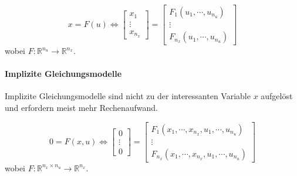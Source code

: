			\begin{equation*}
				x = F(u) \iff
				\begin{bmatrix}
					x _ 1  \\
					\vdots \\
					x _ { n _ x }
				\end{bmatrix}
				=
				\begin{bmatrix}
					F _ 1 (u _ 1, \cdots, u _ { n _ u }) \\
					\vdots                               \\
					F _ { n _ x } (u _ 1, \cdots, u _ { n _ u })
				\end{bmatrix}
			\end{equation*}
			wobei \( F : \mathbb{R} ^ { n _ u } \rightarrow \mathbb{R} ^ { n _ x } \).

		\paragraph{Implizite Gleichungsmodelle}
			Implizite Gleichungsmodelle sind nicht zu der interessanten Variable \( x \) aufgelöst und erfordern meist mehr Rechenaufwand.

			\begin{equation*}
				0 = F(x, u) \iff
				\begin{bmatrix}
					0      \\
					\vdots \\
					0
				\end{bmatrix}
				=
				\begin{bmatrix}
					F _ 1 (x _ 1, \cdots, x _ { n _ x }, u _ 1, \cdots, u _ { n _ u }) \\
					\vdots                                                             \\
					F _ { n _ x } (x _ 1, \cdots, x _ { n _ x }, u _ 1, \cdots, u _ { n _ u })
				\end{bmatrix}
			\end{equation*}
			wobei \( F : \mathbb{R} ^ { n _ x \times n _ u } \rightarrow \mathbb{R} ^ { n _ x } \).

